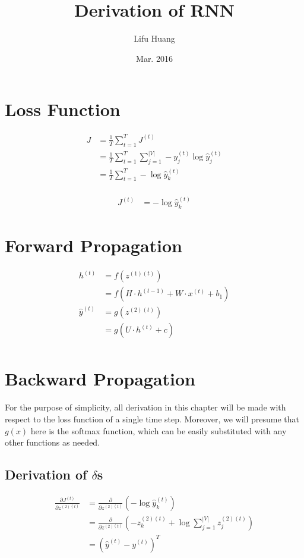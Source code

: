 \documentclass{article}
\title{Derivation of RNN}
\author{Lifu Huang}
\date{Mar. 2016}
\begin{document}
	\maketitle
	\section{Loss Function}
	\begin{equation}
	\begin{aligned}
		J &= \frac{1}{T}\sum_{t=1}^{T} J^{(t)} \\
		&= \frac{1}{T}\sum_{t=1}^{T} \sum_{j=1}^{|V|} -y^{(t)}_j \log \hat{y}^{(t)}_j \\
		&= \frac{1}{T} \sum_{t=1}^T -\log{\hat{y}_k^{(t)}}	\\
	\end{aligned}
	\end{equation}
	
	\begin{equation}
	\begin{aligned}	
		J^{(t)} &= -\log{\hat{y}^{(t)}_k}
	\end{aligned}
	\end{equation}
	
	\section{Forward Propagation}
	\begin{equation}
	\begin{aligned}
		h^{(t)} 
		&= f(z^{(1)(t)}) \\
		&= f(H \cdot h^{(t-1)} + W \cdot x^{(t)} + b_1) \\
		\hat{y}^{(t)} &= g(z^{(2)(t)}) \\
		&= g(U \cdot h^{(t)} + c) \\
	\end{aligned}
	\end{equation}
	\newpage
	\section{Backward Propagation}
	For the purpose of simplicity, all derivation in this chapter will be made with respect to the loss function of a single time step. Moreover, we will presume that $g(x)$ here is the softmax function, which can be easily substituted with any other functions as needed. 
	\subsection{Derivation of $\delta$s}
	\begin{equation}
	\begin{aligned}
		\frac{\partial J^{(t)}}{\partial z^{(2)(t)}} &= \frac{\partial}{\partial z^{(2)(t)}} (-\log{\hat{y}^{(t)}_k}) \\
		&= \frac{\partial}{\partial z^{(2)(t)}} (-z^{(2)(t)}_k + \log{\sum_{j=1}^{|V|} z^{(2)(t)}_j}) \\
		&= (\hat{y}^{(t)} - y^{(t)})^T \\
	\end{aligned}
	\end{equation}
	
\end{document}
